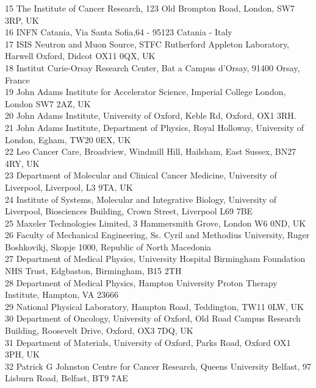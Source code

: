 {\begin{tabbing}
     15 \> The Institute of Cancer Research, 123 Old Brompton Road, London, SW7 3RP, UK\\
     16 \> INFN Catania, Via Santa Sofia,64 - 95123 Catania - Italy\\
     17 \> ISIS Neutron and Muon Source, STFC Rutherford Appleton Laboratory, Harwell Oxford, Didcot OX11 0QX, UK\\
     18 \> Institut Curie-Orsay Research Center, Bat a Campus d'Orsay, 91400 Orsay, France\\
     19 \> John Adams Institute for Accelerator Science, Imperial College London, London SW7 2AZ, UK\\
     20 \> John Adams Institute, University of Oxford, Keble Rd, Oxford, OX1 3RH.\\
     21 \> John Adams Institute, Department of Physics, Royal Holloway, University of London, Egham, TW20 0EX, UK\\
     22 \> Leo Cancer Care, Broadview, Windmill Hill, Hailsham, East Sussex, BN27 4RY, UK\\
     23 \> Department of Molecular and Clinical Cancer Medicine, University of Liverpool, Liverpool, L3 9TA, UK\\
     24 \> Institute of Systems, Molecular and Integrative Biology, University of Liverpool, Biosciences Building, Crown Street, Liverpool L69 7BE\\
     25 \> Maxeler Technologies Limited, 3 Hammersmith Grove, London W6 0ND, UK\\
     26 \> Faculty of Mechanical Engineering, Ss. Cyril and Methodius University,  Ruger Boshkovikj, Skopje 1000, Republic of North Macedonia\\
     27 \> Department of Medical Physics, University Hospital Birmingham Foundation NHS Trust, Edgbaston, Birmingham, B15 2TH\\
     28 \> Department of Medical Physics, Hampton University Proton Therapy Institute, Hampton, VA 23666\\
     29 \> National Physical Laboratory, Hampton Road, Teddington, TW11 0LW, UK\\
     30 \> Department of Oncology, University of Oxford, Old Road Campus Research Building, Roosevelt Drive, Oxford, OX3 7DQ, UK\\
     31 \> Department of Materials, University of Oxford, Parks Road, Oxford OX1 3PH, UK\\
     32 \> Patrick G Johnston Centre for Cancer Research, Queens University Belfast, 97 Lisburn Road, Belfast, BT9 7AE\\

\end{tabbing}}

